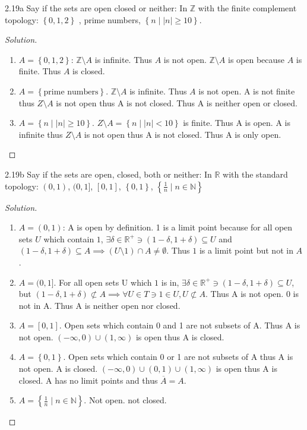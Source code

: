 \documentclass{article}
\newcommand{\R}{\mathbb{R}}
\newcommand{\Z}{\mathbb{Z}}
\newcommand{\N}{\mathbb{N}}
\newcommand{\abs}[1]{\left\lvert #1\right\rvert}
\newenvironment{solution}
{\renewcommand\qedsymbol{$\blacksquare$}\begin{proof}[Solution]}
{\end{proof}}
\begin{document}
\bigskip

\begin{PROB}{2.19a}\label{Problem 2.19a.}
    Say if the sets are open closed or neither: 
    In $\Z$  with the finite complement topology: $\left\{ 0, 1, 2 \right\}$ , {prime numbers}, $\left\{ n \mid |n| \geq 10 \right\}$.
\end{PROB}
\begin{solution}
    \begin{enumerate}
        \item $A = \left\{ 0, 1, 2 \right\}$: $\Z \setminus A$ is infinite. Thus $A$ is not open. $\Z \setminus A$ is open because $A$ is finite. Thus $A$ is closed. 
        \item $A = \left\{ \text{prime numbers} \right\}$. $\Z \setminus A$ is infinite. Thus $A$ is not open. A is not finite thus $Z \setminus A$ is not open thus A is not closed. Thus A is neither open or closed.
        \item $A = \left\{ n \mid \abs{n} \geq 10 \right\}$. $Z \setminus A = \left\{ n \mid \abs{n} < 10 \right\}$ is finite. Thus A is open. A is infinite thus $Z \setminus A$ is not open thus A is not closed. Thus A is only open. 
    \end{enumerate}
\end{solution}
\begin{PROB}{2.19b}\label{Problem 2.19b.}
    Say if the sets are open, closed, both or neither: 
    In $\R$ with the standard topology: $(0, 1)$, $(0, 1]$, $[0, 1]$, $\left\{ 0, 1 \right\}$, $\left\{ \frac{1}{n} \mid n \in \N \right\}$  
\end{PROB}
\begin{solution}
    \begin{enumerate}
        \item $A = (0, 1)$: A is open by definition. 1 is a limit point because for all open sets $U$  which contain $1$, $\exists \delta \in \R^+ \ni (1 - \delta, 1 + \delta) \subseteq U$ and $(1 - \delta, 1 + \delta) \subseteq A \implies \left(U \setminus 1\right) \cap A \neq \emptyset$. Thus $1$ is a limit point but not in $A$. 
        \item $A = (0, 1]$. For all open sets U which $1$ is in, $\exists \delta \in \R^+ \ni (1 - \delta, 1 + \delta) \subseteq U$, but $(1 - \delta, 1 + \delta) \not \subset A \implies \forall U \in T \ni 1 \in U, U \not \subset A$. Thus A is not open. 0 is not in A. Thus A is neither open nor closed. 
        \item $A = [0, 1]$. Open sets which contain 0 and 1 are not subsets of A. Thus A is not open. $(-\infty, 0) \cup (1, \infty)$ is open thus A is closed. 
        \item $A = \left\{ 0, 1 \right\}$. Open sets which contain 0 or 1 are not subsets of A thus A is not open. A is closed. $(-\infty, 0) \cup (0, 1) \cup (1, \infty)$ is open thus A is closed. A has no limit points and thus $\overline{A} = A$. 
        \item $A = \left\{ \frac{1}{n} \mid n \in \N \right\}$. Not open. not closed.              
    \end{enumerate}
\end{solution}
\end{document}
